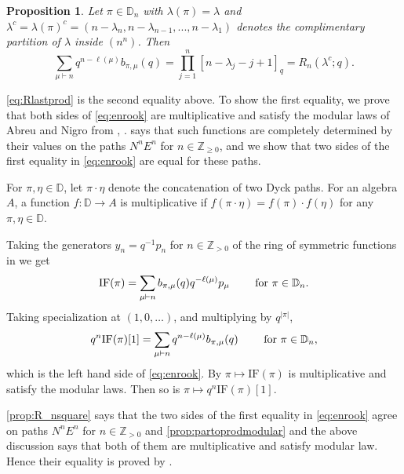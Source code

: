 \documentclass[12pt,reqno]{amsart}
\theoremstyle{plain}
\newtheorem{proposition}[theorem]{Proposition}
\theoremstyle{definition}
\theoremstyle{remark}
\theoremstyle{example}
\numberwithin{equation}{section}
\newcommand\ZZ{\mathbb{Z}}
\newcommand{\DD}{\mathbb{D}}
\begin{document}
\begin{proposition}\label{prop:enrook}
	Let $\pi \in \DD_n$ with $\lambda(\pi) = \lambda$ and $\lambda^{c}=\lambda(\pi)^{c}=(n-\lambda_{n},n-\lambda_{n-1},...,n-\lambda_{1})$ denotes the complimentary partition of $\lambda$ inside $(n^n)$. Then \begin{equation}\label{eq:enrook}
		\sum_{\mu\vdash n}q^{n-\ell(\mu)}b_{\pi,\mu}(q)=\prod_{j=1}^{n}[n-\lambda_{j}-j+1]_{q}=R_{n}(\lambda^{c};q).
	\end{equation}
\end{proposition}
\eqref{eq:Rlastprod} is the second equality above.
To show the first equality, we prove that both sides of \eqref{eq:enrook} are multiplicative and satisfy the modular laws of Abreu and Nigro from \cite{Abreu_Nigro_csfmodular}, \cite{Abreu_Nigro_forests}. \cite[Theorem 1.2]{Abreu_Nigro_csfmodular} says that such functions are completely determined by their values on the paths $N^nE^n$ for $n \in \ZZ_{\geq 0}$, and we show that two sides of the first equality in \eqref{eq:enrook} are equal for these paths.

For $\pi,\eta \in \DD$, let $\pi \cdot \eta$ denote the concatenation of two Dyck paths. For an algebra $A$, a function $f: \DD \to A$ is multiplicative if $f(\pi \cdot \eta) = f(\pi) \cdot f(\eta)$ for any $\pi,\eta \in \DD$.

Taking the generators $y_n = q^{-1}p_n$ for $n \in \ZZ_{>0}$ of the ring of symmetric functions in \cite[Definition 3.1]{Abreu_Nigro_forests} we get $$ \mathrm{IF}(\pi) = \sum_{\mu \vdash n} b_{\pi,\mu}(q) q^{-\ell(\mu)}p_\mu \qquad \hbox{ for } \pi \in \DD_n.$$ Taking specialization at $(1,0,\ldots)$, and multiplying by $q^{|\pi|}$, \begin{equation}
	q^n\mathrm{IF}(\pi)[1] = \sum_{\mu \vdash n}  q^{n-\ell(\mu)} b_{\pi,\mu}(q) \qquad \hbox{ for } \pi \in \DD_n, 
\end{equation} which is the left hand side of \eqref{eq:enrook}.
By \cite[Proposition 3.3, 3.4]{Abreu_Nigro_forests} $\pi \mapsto \mathrm{IF}(\pi)$ is multiplicative and satisfy the modular laws. Then so is $\pi \mapsto q^n\mathrm{IF}(\pi)[1]$. 

\autoref{prop:R_nsquare} says that the two sides of the first equality in \eqref{eq:enrook} agree on paths $N^nE^n$ for $n \in \ZZ_{>0}$ and \autoref{prop:partoprodmodular} and the above discussion says that both of them are multiplicative and satisfy modular law. Hence their equality is proved by \cite[Theorem 1.2]{Abreu_Nigro_csfmodular}.
\end{document}
